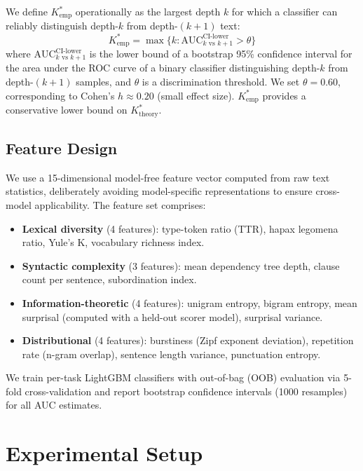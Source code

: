 \documentclass[11pt,a4paper]{article}
\newcommand{\Kempirical}{K^{*}_{\text{emp}}}
\newcommand{\Ktheory}{K^{*}_{\text{theory}}}
\begin{document}
We define $\Kempirical$ operationally as the largest depth $k$ for which a classifier can reliably distinguish depth-$k$ from depth-$(k+1)$ text:
\begin{equation}
    \Kempirical = \max\{k : \text{AUC}_{k \text{ vs } k+1}^{\text{CI-lower}} > \theta\}
\end{equation}
where $\text{AUC}_{k \text{ vs } k+1}^{\text{CI-lower}}$ is the lower bound of a bootstrap 95\% confidence interval for the area under the ROC curve of a binary classifier distinguishing depth-$k$ from depth-$(k+1)$ samples, and $\theta$ is a discrimination threshold. We set $\theta = 0.60$, corresponding to Cohen's $h \approx 0.20$ (small effect size). $\Kempirical$ provides a conservative lower bound on $\Ktheory$.

\subsection{Feature Design}

We use a 15-dimensional model-free feature vector computed from raw text statistics, deliberately avoiding model-specific representations to ensure cross-model applicability. The feature set comprises:

\begin{itemize}[leftmargin=*, itemsep=1pt]
    \item \textbf{Lexical diversity} (4 features): type-token ratio (TTR), hapax legomena ratio, Yule's K, vocabulary richness index.
    \item \textbf{Syntactic complexity} (3 features): mean dependency tree depth, clause count per sentence, subordination index.
    \item \textbf{Information-theoretic} (4 features): unigram entropy, bigram entropy, mean surprisal (computed with a held-out scorer model), surprisal variance.
    \item \textbf{Distributional} (4 features): burstiness (Zipf exponent deviation), repetition rate (n-gram overlap), sentence length variance, punctuation entropy.
\end{itemize}

We train per-task LightGBM classifiers with out-of-bag (OOB) evaluation via 5-fold cross-validation and report bootstrap confidence intervals (1000 resamples) for all AUC estimates.

\section{Experimental Setup}
\label{sec:setup}
\end{document}
